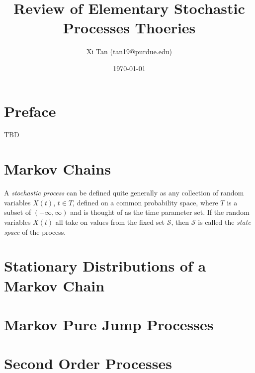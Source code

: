 \documentclass{article}
\title{Review of Elementary Stochastic Processes Thoeries}
\author{Xi Tan (tan19@purdue.edu)}
\date{\today}
\begin{document}
\maketitle
\tableofcontents
\newpage

\section*{Preface}
TBD

\newpage
\section{Markov Chains}
A {\em{stochastic process}} can be defined quite generally as any collection of random variables $X(t)$, $t \in T$, defined on a common probability space, where $T$ is a subset of $(-\infty, \infty)$ and is thought of as the time parameter set. If the random variables $X(t)$ all take on values from the fixed set $\mathscr{S}$, then $\mathscr{S}$ is called the {\em{state space}} of the process.


\section{Stationary Distributions of a Markov Chain}

\section{Markov Pure Jump Processes}
\section{Second Order Processes}
\end{document}
